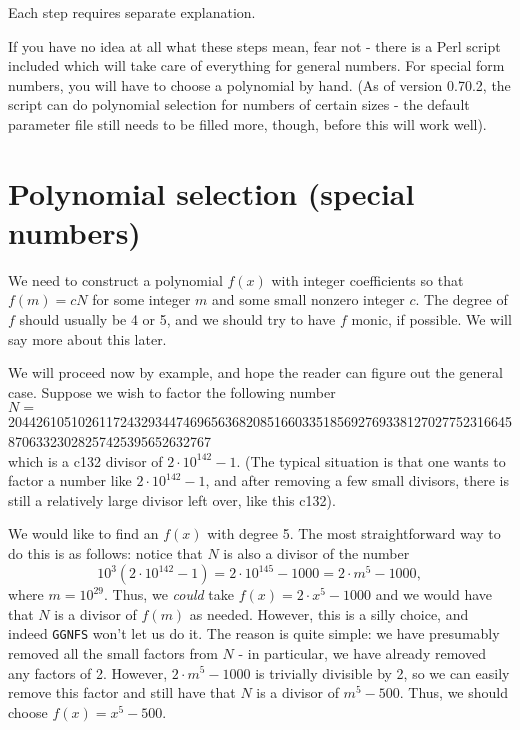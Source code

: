 \documentclass[12pt]{article}
\begin{document}
  Each step requires separate explanation.

  If you have no idea at all what these steps mean, fear not - 
  there is a Perl script included which will take care of everything
  for general numbers. For special form numbers, you will have to
  choose a polynomial by hand. (As of version 0.70.2, the script can
  do polynomial selection for numbers of certain sizes - the default
  parameter file still needs to be filled more, though, before this will
  work well).

\section{Polynomial selection (special numbers)}
  We need to construct a polynomial $f(x)$ with integer coefficients
  so that $f(m)=cN$ for some integer $m$ and some small nonzero integer
  $c$. The degree of $f$ should usually be 4 or 5, and we should try
  to have $f$ monic, if possible. We will say more about this later.

  We will proceed now by example, and hope the reader can figure out
  the general case. Suppose we wish to factor the following number \\
  $N =$ {\small 20442610510261172432934474696563682085166033518569276933812702775231664587063323028257425395652632767} \\
  which is a c132 divisor of $2\cdot 10^{142}-1$. (The typical situation
  is that one wants to factor a number like $2\cdot 10^{142}-1$,
  and after removing a few small divisors, there is still a relatively
  large divisor left over, like this c132).

  We would like to find an $f(x)$ with degree 5. The most straightforward
  way to do this is as follows: notice that $N$ is also a divisor of the
  number
  \[
    10^3(2\cdot 10^{142}-1) = 2\cdot 10^{145}-1000 = 2\cdot m^5 - 1000,
  \]
  where $m=10^{29}$. Thus, we {\em could} take $f(x)=2\cdot x^5 -1000$
  and we would have that $N$ is a divisor of $f(m)$ as needed. However,
  this is a silly choice, and indeed {\tt GGNFS} won't let us do it.
  The reason is quite simple: we have presumably removed all the small
  factors from $N$ - in particular, we have already removed any factors
  of 2. However, $2\cdot m^5 - 1000$ is trivially divisible by 2, so we
  can easily remove this factor and still have that $N$ is a divisor
  of $m^5-500$. Thus, we should choose $f(x)=x^5-500$.
\end{document}
